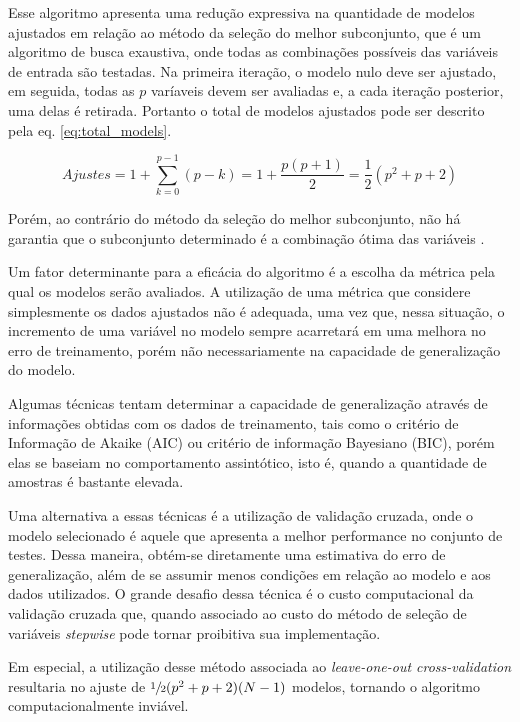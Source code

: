 \qquad

Esse algoritmo apresenta uma redução expressiva na quantidade de modelos ajustados em relação ao método da seleção do melhor subconjunto, que é um algoritmo de busca exaustiva, onde todas as combinações possíveis das variáveis de entrada são testadas. Na primeira iteração, o modelo nulo deve ser ajustado, em seguida, todas as $p$ varíaveis devem ser avaliadas e, a cada iteração posterior, uma delas é retirada. Portanto o total de modelos ajustados pode ser descrito pela eq. \ref{eq:total_models}.

\begin{equation}
    Ajustes = 1 + \sum^{p-1}_{k = 0} (p-k) = 1 + \dfrac{p (p+1)}{2} =  \dfrac{1}{2} (p^2 + p  + 2)
    \label{eq:total_models}
\end{equation}

Porém, ao contrário do método da seleção do melhor subconjunto, não há garantia que o subconjunto determinado é a combinação ótima das variáveis \cite[p. 208]{intro_stat_learn}.

Um fator determinante para a eficácia do algoritmo é a escolha da métrica pela qual os modelos serão avaliados. A utilização de uma métrica que considere simplesmente os dados ajustados não é adequada, 
uma vez que, nessa situação, o incremento de uma variável no modelo sempre acarretará em uma melhora no erro de treinamento, porém não necessariamente na capacidade de generalização do modelo.

Algumas técnicas tentam determinar a capacidade de generalização através de informações obtidas com os dados de treinamento, tais como o critério de Informação de Akaike (AIC) ou critério de informação Bayesiano (BIC), porém elas se baseiam no comportamento assintótico, isto é, quando a quantidade de amostras é bastante elevada.

Uma alternativa a essas técnicas é a utilização de validação cruzada, onde o modelo selecionado é aquele que apresenta a melhor performance no conjunto de testes. Dessa maneira, obtém-se diretamente uma estimativa do erro de generalização, além de se assumir menos condições em relação ao modelo e aos dados utilizados. O grande desafio dessa técnica é o custo computacional da validação cruzada que, quando associado ao custo do método de seleção de variáveis \textit{stepwise} pode tornar proibitiva sua implementação.

Em especial, a utilização desse método associada ao \textit{leave-one-out cross-validation} resultaria no ajuste de $\sfrac{1}{2}(p^2+p+2)(N-1)$ modelos, tornando o algoritmo computacionalmente inviável.

